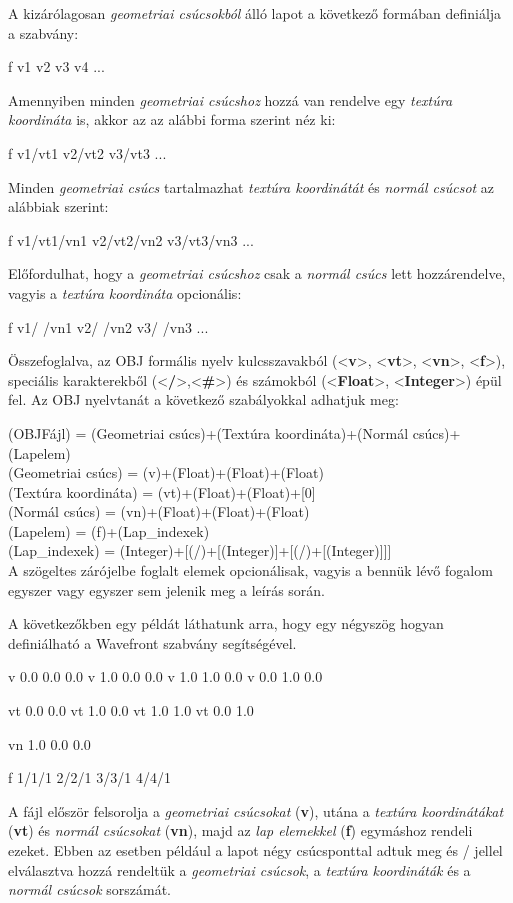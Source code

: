 
A kizárólagosan \textsl{geometriai csúcsokból} álló lapot a következő formában definiálja a szabvány:
\begin{python}
f v1 v2 v3 v4 ...
\end{python}
Amennyiben minden \textsl{geometriai csúcshoz} hozzá van rendelve egy \textsl{textúra koordináta} is, akkor az az alábbi forma szerint néz ki:
\begin{python}
f v1/vt1 v2/vt2 v3/vt3 ...
\end{python}
\bigskip
Minden \textsl{geometriai csúcs} tartalmazhat \textsl{textúra koordinátát} és \textsl{normál csúcsot} az alábbiak szerint:
\begin{python}
f v1/vt1/vn1 v2/vt2/vn2 v3/vt3/vn3 ...
\end{python}
Előfordulhat, hogy a \textsl{geometriai csúcshoz} csak a \textsl{normál csúcs} lett hozzárendelve, vagyis a \textsl{textúra koordináta} opcionális:
\begin{python}
f v1/ /vn1 v2/ /vn2 v3/ /vn3 ...
\end{python}

Összefoglalva, az OBJ formális nyelv kulcsszavakból (<\textbf{v}>, <\textbf{vt}>, <\textbf{vn}>, <\textbf{f}>), speciális karakterekből (<\textbf{/}>,<\textbf{\#}>) és számokból (<\textbf{Float}>, <\textbf{Integer}>) épül fel. Az OBJ nyelvtanát a következő szabályokkal adhatjuk meg:

\bigskip

\noindent(OBJFájl) = {(Geometriai csúcs)}+{(Textúra koordináta)}+{(Normál csúcs)}+{(Lapelem)}\\
(Geometriai csúcs) = (v)+(Float)+(Float)+(Float)\\
(Textúra koordináta) = (vt)+(Float)+(Float)+[0]\\
(Normál csúcs) = (vn)+(Float)+(Float)+(Float)\\
(Lapelem) = (f)+{(Lap{\_}indexek)}\\
(Lap{\_}indexek) = (Integer)+[(/)+[(Integer)]+[(/)+[(Integer)]]]\\

\noindent A szögeltes zárójelbe foglalt elemek opcionálisak, vagyis a bennük lévő fogalom egyszer vagy egyszer sem jelenik meg a leírás során.

A következőkben egy példát láthatunk arra, hogy egy négyszög hogyan definiálható a Wavefront szabvány segítségével.
\begin{python}
v 0.0 0.0 0.0
v 1.0 0.0 0.0
v 1.0 1.0 0.0
v 0.0 1.0 0.0

vt 0.0 0.0
vt 1.0 0.0
vt 1.0 1.0
vt 0.0 1.0

vn 1.0 0.0 0.0

f 1/1/1 2/2/1 3/3/1 4/4/1
\end{python}
A fájl először felsorolja a \textsl{geometriai csúcsokat} (\textbf{v}), utána a \textsl{textúra koordinátákat} (\textbf{vt}) és \textsl{normál csúcsokat} (\textbf{vn}), majd az \textsl{lap elemekkel} (\textbf{f}) egymáshoz rendeli ezeket. Ebben az esetben például a lapot négy csúcsponttal adtuk meg és {/} jellel elválasztva hozzá rendeltük a  \textsl{geometriai csúcsok}, a \textsl{textúra koordináták} és a \textsl{normál csúcsok} sorszámát.

